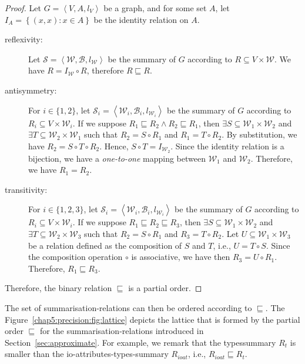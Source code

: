 \begin{proof}
	Let $G=\left\langle V, A, l_V \right\rangle$ be a graph, and for some set $A$, let $I_A = \left\lbrace (x, x) : x \in A \right\rbrace$ be the identity relation on $A$.
	\begin{description}
		\item[reflexivity:] Let $\mathcal{S} = \left\langle \mathcal{W}, \mathcal{B}, l_{\mathcal{W}} \right\rangle$ be the summary of $G$ according to $R \subseteq V \times \mathcal{W}$. We have $R = I_\mathcal{W} \circ R$, therefore $R \sqsubseteq R$.
		\item[antisymmetry:] For $i \in \{1, 2\}$, let $\mathcal{S}_i = \left\langle \mathcal{W}_i, \mathcal{B}_i, l_{\mathcal{W}_i} \right\rangle$ be the summary of $G$ according to $R_i \subseteq V \times \mathcal{W}_i$. If we suppose $R_1 \sqsubseteq R_2 \wedge R_2 \sqsubseteq R_1$, then $\exists S \subseteq \mathcal{W}_1 \times \mathcal{W}_2$ and $\exists T \subseteq \mathcal{W}_2 \times \mathcal{W}_1$ such that $R_2 = S \circ R_1$ and $R_1 = T \circ R_2$. By substitution, we have $R_2 = S \circ T \circ R_2$. Hence, $S \circ T = I_{\mathcal{W}_2}$. Since the identity relation is a bijection, we have a \emph{one-to-one} mapping between $\mathcal{W}_1$ and $\mathcal{W}_2$. Therefore, we have $R_1 = R_2$.
		\item[transitivity:] For $i \in \{1, 2, 3\}$, let $\mathcal{S}_i = \left\langle \mathcal{W}_i, \mathcal{B}_i, l_{\mathcal{W}_i} \right\rangle$ be the summary of $G$ according to $R_i \subseteq V \times \mathcal{W}_i$. If we suppose $R_1 \sqsubseteq R_2 \sqsubseteq R_3$, then $\exists S \subseteq \mathcal{W}_1 \times \mathcal{W}_2$ and $\exists T \subseteq \mathcal{W}_2 \times \mathcal{W}_3$ such that $R_2 = S \circ R_1$ and $R_3 = T \circ R_2$. Let $U \subseteq \mathcal{W}_1 \times \mathcal{W}_3$ be a relation defined as the composition of $S$ and $T$, i.e., $U = T \circ S$. Since the composition operation $\circ$ is associative, we have then $R_3 = U \circ R_1$. Therefore, $R_1 \sqsubseteq R_3$.
	\end{description}
	Therefore, the binary relation $\sqsubseteq$ is a partial order.
\end{proof}

The set of \glspl{summarisation-relation} can then be ordered according to $\sqsubseteq$. The Figure~\ref{chap5:precision:fig:lattice} depicts the lattice that is formed by the partial order $\sqsubseteq$ for the \glspl{summarisation-relation} introduced in Section~\ref{sec:approximate}. For example, we remark that the \gls{typessummary} $R_t$ is smaller than the \gls{io-attributes-types-summary} $R_{ioat}$, i.e., $R_{ioat} \sqsubseteq R_t$.

